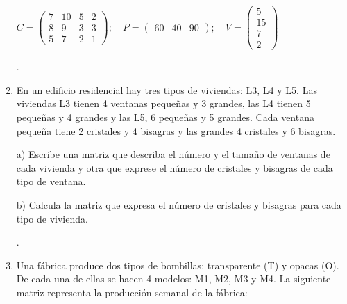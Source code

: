 \begin{enumerate}
$C=\left( \begin{array}{cccc} 7&10&5&2 \\ 8&9&3&3 \\ 5&7&2&1 \end{array} \right); \quad  P=\left( \begin{array} {ccc} 60&40&90 \end{array} \right); \quad V=\left( \begin{array}{c} 5 \\ 15 \\ 7 \\ 2 \end{array} \right)$ 

.


\item En un edificio residencial hay tres tipos de viviendas: L3, L4 y L5. Las viviendas L3 tienen 4 ventanas pequeñas y 3 grandes, las L4 tienen 5 pequeñas y 4 grandes y las L5, 6 pequeñas y 5 grandes. Cada ventana pequeña tiene 2 cristales y 4 bisagras y las grandes 4 cristales y 6 bisagras.

a) Escribe una matriz que describa el número y el tamaño de ventanas de cada vivienda y otra que exprese el número de cristales y bisagras de cada tipo de ventana.

b) Calcula la matriz que expresa el número de cristales y bisagras para cada tipo de vivienda.

.

\item Una fábrica produce dos tipos de bombillas: transparente (T) y opacas (O). De cada una de ellas se hacen 4 modelos: M1, M2, M3 y M4. La siguiente matriz representa la producción semanal de la fábrica:


\end{enumerate}
